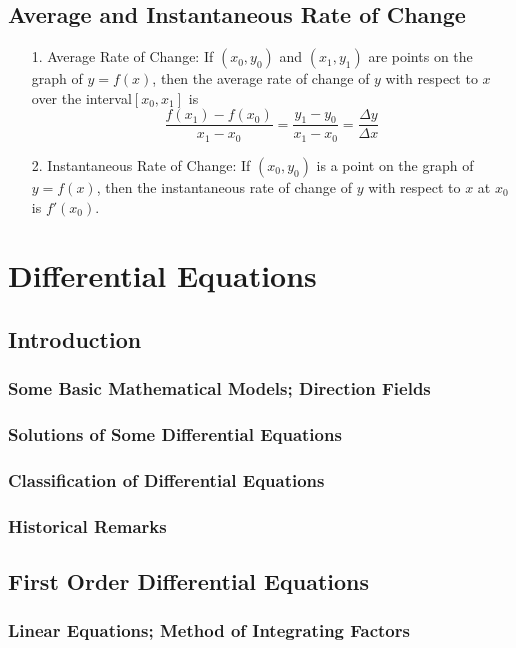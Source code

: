 \documentclass[10pt]{report}
\begin{document}
\section{Average and Instantaneous Rate of Change}
\begin{itemize}
\item[1.] Average Rate of Change: If $(x_{0}, y_{0})$ and $(x_{1},y_{1})$ are points on the graph of $y = f(x)$, then the average rate of change of $y$ with respect to $x$ over the interval$[x_{0},x_{1}]$ is\\
$$\frac{f(x_{1}) - f(x_{0})}{x_{1}-x_{0}} = \frac{y_{1} - y_{0}}{x_{1} - x_{0}} = \frac{\Delta y}{\Delta x}$$
\item[2.] Instantaneous Rate of Change: If $(x_{0},y_{0})$ is a point on the graph of $y = f(x)$, then the instantaneous rate of change of $y$ with respect to $x$ at $x_{0}$ is $f'(x_{0})$.
\end{itemize}

\chapter{Differential Equations}
\section{Introduction}
\subsection{Some Basic Mathematical Models; Direction Fields}
\subsection{Solutions of Some Differential Equations}
\subsection{Classification of Differential Equations}
\subsection{Historical Remarks}
\section{First Order Differential Equations}
\subsection{Linear Equations; Method of Integrating Factors}
\end{document}
